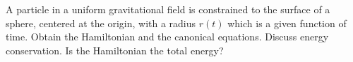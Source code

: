 \documentclass[../main.tex]{subfiles}
\begin{document}
\begin{problema}
	A particle in a uniform gravitational field is constrained to the surface
	of a sphere, centered at the origin, with a radius \(r(t)\) which is a
	given function of time. Obtain the Hamiltonian and the canonical equations.
	Discuss energy conservation. Is the Hamiltonian the total energy?
\end{problema}
\end{document}
